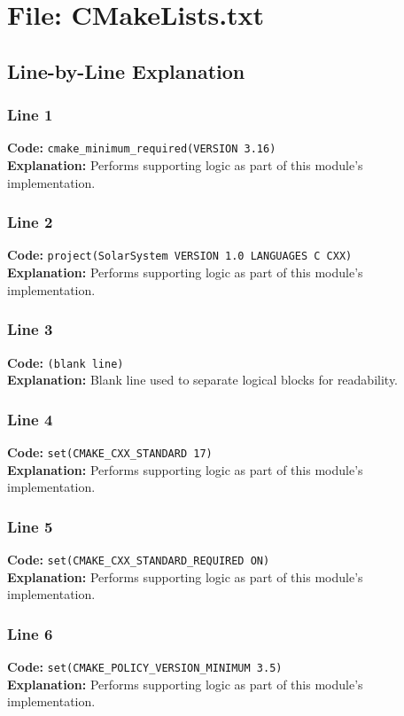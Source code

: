 \documentclass[11pt,a4paper]{article}
\begin{document}
\newpage
\section{File: CMakeLists.txt}
\subsection{Line-by-Line Explanation}
\subsubsection*{Line 1}
\textbf{Code:} \verb|cmake_minimum_required(VERSION 3.16)|\\
\textbf{Explanation:} Performs supporting logic as part of this module's implementation.

\subsubsection*{Line 2}
\textbf{Code:} \verb|project(SolarSystem VERSION 1.0 LANGUAGES C CXX)|\\
\textbf{Explanation:} Performs supporting logic as part of this module's implementation.

\subsubsection*{Line 3}
\textbf{Code:} \texttt{(blank line)}\\
\textbf{Explanation:} Blank line used to separate logical blocks for readability.

\subsubsection*{Line 4}
\textbf{Code:} \verb|set(CMAKE_CXX_STANDARD 17)|\\
\textbf{Explanation:} Performs supporting logic as part of this module's implementation.

\subsubsection*{Line 5}
\textbf{Code:} \verb|set(CMAKE_CXX_STANDARD_REQUIRED ON)|\\
\textbf{Explanation:} Performs supporting logic as part of this module's implementation.

\subsubsection*{Line 6}
\textbf{Code:} \verb|set(CMAKE_POLICY_VERSION_MINIMUM 3.5)|\\
\textbf{Explanation:} Performs supporting logic as part of this module's implementation.
\end{document}
